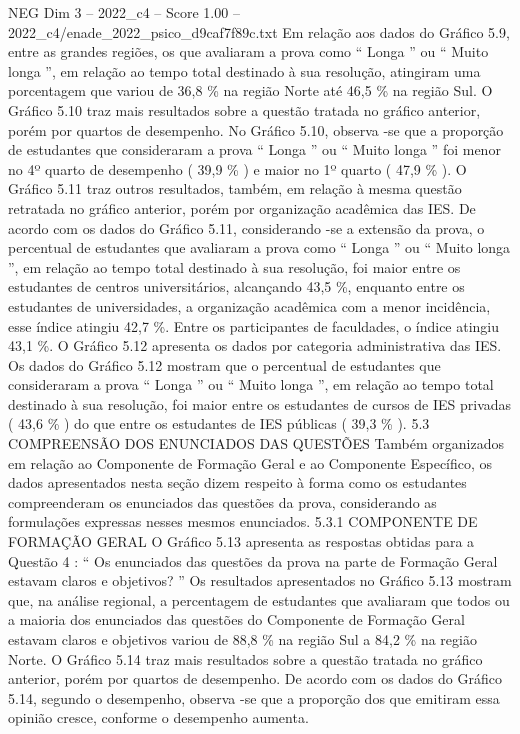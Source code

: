 \begin{textsample}{NEG Dim 3 – 2022\_c4 – Score 1.00 – 2022\_c4/enade\_2022\_psico\_d9caf7f89c.txt}
Em relação aos dados do Gráfico 5.9, entre as grandes regiões, os que avaliaram a prova como “ Longa ” ou “ Muito longa ”, em relação ao tempo total destinado à sua resolução, atingiram uma porcentagem que variou de 36,8 \% na região Norte até 46,5 \% na região Sul.
O Gráfico 5.10 traz mais resultados sobre a questão tratada no gráfico anterior, porém por quartos de desempenho.
No Gráfico 5.10, observa -se que a proporção de estudantes que consideraram a prova “ Longa ” ou “ Muito longa ” foi menor no 4º quarto de desempenho ( 39,9 \% ) e maior no 1º quarto ( 47,9 \% ).
O Gráfico 5.11 traz outros resultados, também, em relação à mesma questão retratada no gráfico anterior, porém por organização acadêmica das IES.
De acordo com os dados do Gráfico 5.11, considerando -se a extensão da prova, o percentual de estudantes que avaliaram a prova como “ Longa ” ou “ Muito longa ”, em relação ao tempo total destinado à sua resolução, foi maior entre os estudantes de centros universitários, alcançando 43,5 \%, enquanto entre os estudantes de universidades, a organização acadêmica com a menor incidência, esse índice atingiu 42,7 \%.
Entre os participantes de faculdades, o índice atingiu 43,1 \%.
O Gráfico 5.12 apresenta os dados por categoria administrativa das IES.
Os dados do Gráfico 5.12 mostram que o percentual de estudantes que consideraram a prova “ Longa ” ou “ Muito longa ”, em relação ao tempo total destinado à sua resolução, foi maior entre os estudantes de cursos de IES privadas ( 43,6 \% ) do que entre os estudantes de IES públicas ( 39,3 \% ). 5.3 COMPREENSÃO DOS ENUNCIADOS DAS QUESTÕES Também organizados em relação ao Componente de Formação Geral e ao Componente Específico, os dados apresentados nesta seção dizem respeito à forma como os estudantes compreenderam os enunciados das questões da prova, considerando as formulações expressas nesses mesmos enunciados. 5.3.1 COMPONENTE DE FORMAÇÃO GERAL O Gráfico 5.13 apresenta as respostas obtidas para a Questão 4 : “ Os enunciados das questões da prova na parte de Formação Geral estavam claros e objetivos? ” Os resultados apresentados no Gráfico 5.13 mostram que, na análise regional, a percentagem de estudantes que avaliaram que todos ou a maioria dos enunciados das questões do Componente de Formação Geral estavam claros e objetivos variou de 88,8 \% na região Sul a 84,2 \% na região Norte.
O Gráfico 5.14 traz mais resultados sobre a questão tratada no gráfico anterior, porém por quartos de desempenho.
De acordo com os dados do Gráfico 5.14, segundo o desempenho, observa -se que a proporção dos que emitiram essa opinião cresce, conforme o desempenho aumenta.

\end{textsample}
